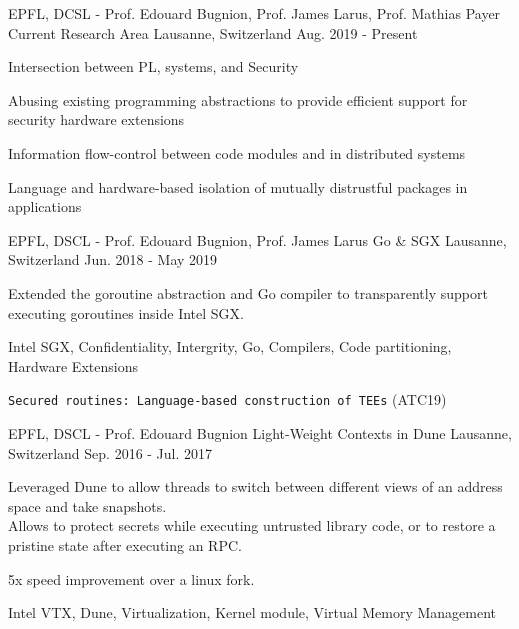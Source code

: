 


\begin{cventries}

\cventry
{EPFL, DCSL - Prof. Edouard Bugnion, Prof. James Larus, Prof. Mathias Payer}
{Current Research Area}
{Lausanne, Switzerland}
{Aug. 2019 - Present}
{ %
	\begin{cvitems}
  \item{Intersection between PL, systems, and Security}
	\item{Abusing existing programming abstractions to provide efficient support for
    security hardware extensions}
  \item{Information flow-control between code modules and in distributed systems}
  \item{Language and hardware-based isolation of mutually distrustful packages in applications}
	\end{cvitems}
}


\cventry
{EPFL, DSCL - Prof. Edouard Bugnion, Prof. James Larus}
  {Go \& SGX}
{Lausanne, Switzerland}
{Jun. 2018  - May 2019}
{
	\begin{cvitems}
	\item{Extended the goroutine abstraction and Go compiler to transparently
    support executing goroutines inside Intel SGX.}
	\item{Intel SGX, Confidentiality, Intergrity, Go, Compilers, Code partitioning, Hardware Extensions}
  \item{\texttt{Secured routines: Language-based construction of TEEs} (ATC19)}
	\end{cvitems}
}

\cventry
{EPFL, DSCL - Prof. Edouard Bugnion}
{Light-Weight Contexts in Dune}
{Lausanne, Switzerland}
{Sep. 2016 - Jul. 2017}
{
	\begin{cvitems}
  \item{Leveraged Dune to allow threads to switch between different views of
    an address space and take snapshots.\\Allows to protect secrets while executing untrusted library code, or to restore a pristine state after executing an RPC.}
  \item{5x speed improvement over a linux fork.}
	\item{Intel VTX, Dune, Virtualization, Kernel module, Virtual Memory Management}
	\end{cvitems}
}


\end{cventries}
